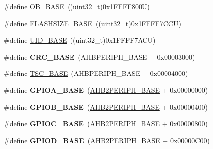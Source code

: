 \begin{DoxyCompactItemize}
\item 
\#define \hyperlink{group___peripheral__memory__map_gab5b5fb155f9ee15dfb6d757da1adc926}{O\+B\+\_\+\+B\+A\+SE}~((uint32\+\_\+t)0x1\+F\+F\+F\+F800\+U)
\item 
\#define \hyperlink{group___peripheral__memory__map_ga776d985f2d4d40b588ef6ca9d573af78}{F\+L\+A\+S\+H\+S\+I\+Z\+E\+\_\+\+B\+A\+SE}~((uint32\+\_\+t)0x1\+F\+F\+F\+F7\+C\+C\+U)
\item 
\#define \hyperlink{group___peripheral__memory__map_ga664eda42b83c919b153b07b23348be67}{U\+I\+D\+\_\+\+B\+A\+SE}~((uint32\+\_\+t)0x1\+F\+F\+F\+F7\+A\+C\+U)
\item 
\mbox{\label{group___peripheral__memory__map_ga656a447589e785594cbf2f45c835ad7e}} 
\#define {\bfseries C\+R\+C\+\_\+\+B\+A\+SE}~(A\+H\+B\+P\+E\+R\+I\+P\+H\+\_\+\+B\+A\+SE + 0x00003000)
\item 
\#define \hyperlink{group___peripheral__memory__map_ga2bba7a31caeacaacd433abb71781e0af}{T\+S\+C\+\_\+\+B\+A\+SE}~(A\+H\+B\+P\+E\+R\+I\+P\+H\+\_\+\+B\+A\+SE + 0x00004000)
\item 
\mbox{\label{group___peripheral__memory__map_gad7723846cc5db8e43a44d78cf21f6efa}} 
\#define {\bfseries G\+P\+I\+O\+A\+\_\+\+B\+A\+SE}~(\hyperlink{group___peripheral__memory__map_gaeedaa71d22a1948492365e2cd26cfd46}{A\+H\+B2\+P\+E\+R\+I\+P\+H\+\_\+\+B\+A\+SE} + 0x00000000)
\item 
\mbox{\label{group___peripheral__memory__map_gac944a89eb789000ece920c0f89cb6a68}} 
\#define {\bfseries G\+P\+I\+O\+B\+\_\+\+B\+A\+SE}~(\hyperlink{group___peripheral__memory__map_gaeedaa71d22a1948492365e2cd26cfd46}{A\+H\+B2\+P\+E\+R\+I\+P\+H\+\_\+\+B\+A\+SE} + 0x00000400)
\item 
\mbox{\label{group___peripheral__memory__map_ga26f267dc35338eef219544c51f1e6b3f}} 
\#define {\bfseries G\+P\+I\+O\+C\+\_\+\+B\+A\+SE}~(\hyperlink{group___peripheral__memory__map_gaeedaa71d22a1948492365e2cd26cfd46}{A\+H\+B2\+P\+E\+R\+I\+P\+H\+\_\+\+B\+A\+SE} + 0x00000800)
\item 
\mbox{\label{group___peripheral__memory__map_ga1a93ab27129f04064089616910c296ec}} 
\#define {\bfseries G\+P\+I\+O\+D\+\_\+\+B\+A\+SE}~(\hyperlink{group___peripheral__memory__map_gaeedaa71d22a1948492365e2cd26cfd46}{A\+H\+B2\+P\+E\+R\+I\+P\+H\+\_\+\+B\+A\+SE} + 0x00000\+C00)

\end{DoxyCompactItemize}
